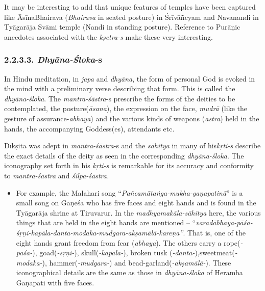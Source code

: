It may be interesting to add that unique features of temples have been captured like ĀsīnaBhairava (\textit{Bhairava} in seated posture) in Śrīvāñcyam and Navanandi in Tyāgarāja Svāmi temple (Nandi in standing posture). Reference to Purāṇic anecdotes associated with the \textit{kṣetra-s} make these very interesting.


\vspace{-.3cm}

\subsubsection*{2.2.3.3. \textit{Dhyāna-Śloka}-s}

\vspace{-.2cm}

In Hindu meditation, in \textit{japa} and \textit{dhyāna}, the form of personal God is evoked in the mind with a preliminary verse describing that form. This is called the \textit{dhyāna-śloka}. The \textit{mantra-śāstra}-s prescribe the forms of the deities to be contemplated, the posture(\textit{āsana}), the expression on the face, \textit{mudrā} (like the gesture of assurance-\textit{abhaya}) and the various kinds of weapons (\textit{astra}) held in the hands, the accompanying Goddess(es), attendants etc.

Dīkṣita was adept in \textit{mantra-śāstra}-s and the \textit{sāhitya} in many of his\break \textit{kṛti-s} describe the exact details of the deity as seen in the corresponding \textit{dhyāna-śloka}. The iconography set forth in his \textit{kṛti-s} is remarkable for its accuracy and conformity to \textit{mantra-śāstra} and \textit{śilpa-śāstra.}

\begin{itemize}

 \item For example, the Malahari song “\textit{Pañcamātaṅga-mukha-gaṇapa\-tinā}” is a small song on Gaṇeśa who has five faces and eight hands and is found in the Tyāgarāja shrine at Tiruvarur. In the \textit{madhyamakāla-sāhitya} here, the various things that are held in the eight hands are mentioned – “\textit{varadābhaya-pāśa-śṛṇi-kapāla-danta-modaka-mudgara-akṣamālā-kareṇa”}. That is, one of the eight hands grant freedom from fear (\textit{abhaya}). The others carry a rope(\textit{-pāśa-}), goad(\textit{-sṛṇi-}), skull(\textit{-kapāla-}), broken tusk (\textit{-danta-}),\break sweetmeat(\textit{-modaka-}), hammer(\textit{-mudgara-}) and bead-garland\break (\textit{-akṣamālā-}). These iconographical details are the same as those in \textit{dhyāna-śloka} of Heramba Gaṇapati with five faces.
\end{itemize}


